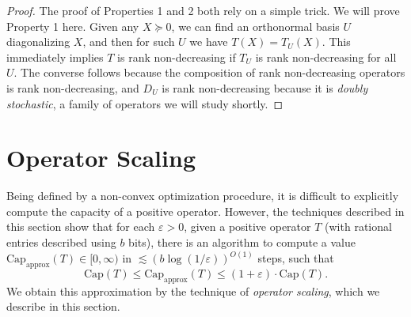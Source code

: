 \documentclass[12pt]{article}
\begin{document}
\begin{proof}
    The proof of Properties 1 and 2 both rely on a simple trick. We will prove Property 1 here. Given any $X \succeq 0$, we can find an orthonormal basis $U$ diagonalizing $X$, and then for such $U$ we have $T(X) = T_U(X)$. This immediately implies $T$ is rank non-decreasing if $T_U$ is rank non-decreasing for all $U$. The converse follows because the composition of rank non-decreasing operators is rank non-decreasing, and $D_U$ is rank non-decreasing because it is \emph{doubly stochastic}, a family of operators we will study shortly.
\end{proof}

\section{Operator Scaling}

Being defined by a non-convex optimization procedure, it is difficult to explicitly compute the capacity of a positive operator. However, the techniques described in this section show that for each $\varepsilon > 0$, given a positive operator $T$ (with rational entries described using $b$ bits), there is an algorithm to compute a value $\text{Cap}_{\text{approx}}(T) \in [0,\infty)$ in $\lesssim (b \log(1/\varepsilon))^{O(1)}$ steps, such that
%
\[ \text{Cap}(T) \leq \text{Cap}_{\text{approx}}(T) \leq (1 + \varepsilon) \cdot \text{Cap}(T). \]
%
We obtain this approximation by the technique of \emph{operator scaling}, which we describe in this section.
\end{document}
